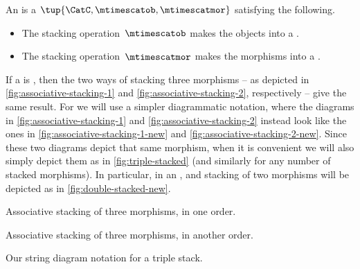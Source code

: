 \begin{ctdefinition}
    \label{def:assoc-stacking-semi-cat}
    An  is a  $\tup{\CatC, \mtimescatob, \mtimescatmor}$ satisfying the following.

    \condit
    \begin{itemize}
        \item The stacking operation~$\mtimescatob$ makes the objects into a .
        \item The stacking operation~$\mtimescatmor$ makes the morphisms into a .
    \end{itemize}
\end{ctdefinition}

If a  is , then the two ways of stacking three morphisms -- as depicted in \cref{fig:associative-stacking-1} and \cref{fig:associative-stacking-2}, respectively -- give the same result.
For   we will use a simpler diagrammatic notation, where the diagrams in \cref{fig:associative-stacking-1} and \cref{fig:associative-stacking-2} instead look like the ones in \cref{fig:associative-stacking-1-new} and \cref{fig:associative-stacking-2-new}.
Since these two diagrams depict that same morphism, when it is convenient we will also simply depict them as in \cref{fig:triple-stacked} (and similarly for any number of stacked morphisms).
In particular, in an  , and stacking of two morphisms will be depicted as in \cref{fig:double-stacked-new}.

\begin{marginfigure}[]
    \centering
    \caption{Associative stacking of three morphisms, in one order.}
    \label{fig:associative-stacking-1-new}
\end{marginfigure}

\begin{marginfigure}
    \centering
    \caption{Associative stacking of three morphisms, in another order.}
    \label{fig:associative-stacking-2-new}
\end{marginfigure}

\begin{marginfigure}
    \centering
    \caption{Our string diagram notation for a triple stack.}
    \label{fig:triple-stacked}
\end{marginfigure}

